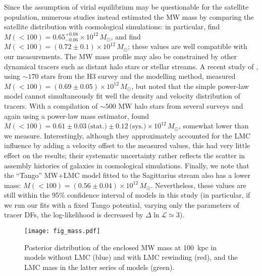 \documentclass[usenatbib,fleqn]{mnras}
\begin{document}
Since the assumption of virial equilibrium may be questionable for the satellite population, numerous studies instead estimated the MW mass by comparing the satellite distribution with cosmological simulations: in particular, \citet{Cautun2020} find $M(<100) = 0.65^{+0.08}_{-0.06}\times10^{12}\,M_\odot$, and \citet{Li2020a} find $M(<100) = (0.72\pm0.1) \times10^{12}\,M_\odot$; these values are well compatible with our measurements. 
The MW mass profile may also be constrained by other dynamical tracers such as distant halo stars or stellar streams. A recent study of \citet{Shen2021}, using $\sim 170$ stars from the H3 survey and the \citet{Eadie2019} modelling method, measured $M(<100) = (0.69\pm 0.05)\times10^{12}\,M_\odot$, but noted that the simple power-law model cannot simultaneously fit well the density and velocity distribution of tracers. With a compilation of $\sim500$ MW halo stars from several surveys and again using a power-law mass estimator, \citet{Deason2021} found $M(<100) = 0.61 \pm 0.03\,\text{(stat.)} \pm 0.12\,\text{(sys.)} \times 10^{12}\,M_\odot$, somewhat lower than we measure. Interestingly, although they approximately accounted for the LMC influence by adding a velocity offset to the measured values, this had very little effect on the results; their systematic uncertainty rather reflects the scatter in assembly histories of galaxies in cosmological simulations.  Finally, we note that the ``Tango'' MW+LMC model fitted to the Sagittarius stream \citep{Vasiliev2021b} also has a lower mass: $M(<100) = (0.56 \pm 0.04) \times 10^{12}\,M_\odot$. Nevertheless, these values are still within the 95\% confidence interval of models in this study (in particular, if we run our fits with a fixed Tango potential, varying only the parameters of tracer DFs, the log-likelihood is decreased by $\Delta\ln\mathcal L\simeq 3$).

\begin{figure}
\texttt{[image: fig\_mass.pdf]}
\caption{
Posterior distribution of the enclosed MW mass at 100~kpc in models without LMC (blue) and with LMC rewinding (red), and the LMC mass in the latter series of models (green).
}  \label{fig:mass}
\end{figure}
\end{document}
